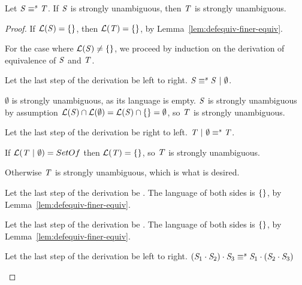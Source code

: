 \documentclass[acmsmall]{acmart}
\begin{document}
\begin{lemma}
  Let $\mathit{S} \equiv^s \mathit{T}$.
  If $\mathit{S}$ is strongly unambiguous, then $\mathit{T}$ is strongly unambiguous.
\end{lemma}
\begin{proof}
  If $\mathcal{L}(\mathit{S}) = \{\}$, then $\mathcal{L}(\mathit{T}) = \{\}$,
  by Lemma~\ref{lem:defequiv-finer-equiv}.

  For the case where $\mathcal{L}(\mathit{S}) \neq \{\}$, we proceed by
  induction on the derivation of equivalence of $\mathit{S}$ and $\mathit{T}$.
  \begin{case}
    Let the last step of the derivation be \OrIdentityRule{} left to right.
    $\mathit{S} \equiv^s \mathit{S} ~|~ \emptyset$.

    $\emptyset$ is strongly unambiguous, as its language is empty.
    $\mathit{S}$ is strongly unambiguous by assumption
    $\mathcal{L}(\mathit{S}) \cap \mathcal{L}(\emptyset) =
    \mathcal{L}(\mathit{S}) \cap \{\} = \emptyset$, so $\mathit{T}$ is
    strongly unambiguous.
  \end{case}

  \begin{case}
    Let the last step of the derivation be \OrIdentityRule{} right to left.
    $\mathit{T} ~|~ \emptyset \equiv^s \mathit{T}$.

    If $\mathcal{L}(\mathit{T} ~|~ \emptyset) = SetOf{}$ then
    $\mathcal{L}(\mathit{T}) = \{\}$, so $\mathit{T}$ is strongly unambiguous.

    Otherwise $\mathit{T}$ is strongly unambiguous, which is what is desired.
  \end{case}

  \begin{case}
    Let the last step of the derivation be \EmptyProjectionRightRule{}.
    The language of both sides is $\{\}$, by
    Lemma~\ref{lem:defequiv-finer-equiv}.
  \end{case}

  \begin{case}
    Let the last step of the derivation be \EmptyProjectionLeftRule{}.
    The language of both sides is $\{\}$, by
    Lemma~\ref{lem:defequiv-finer-equiv}.
  \end{case}
  
  \begin{case}
    Let the last step of the derivation be \ConcatAssocRule{} left to right.
    $(\mathit{S}_1\cdot\mathit{S}_2)\cdot\mathit{S}_3
    \equiv^s
    \mathit{S}_1\cdot(\mathit{S}_2\cdot\mathit{S}_3)$


\end{case}
\end{proof}
\end{document}
